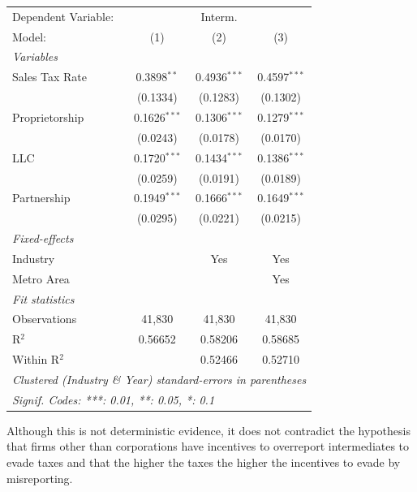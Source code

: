\documentclass[
  12pt]{article}
\theoremstyle{definition}
\theoremstyle{remark}
\begin{document}
\begin{table}
\begin{minipage}{\linewidth}
\begingroup
\centering
\begin{tabular}{lccc}
   \tabularnewline \midrule \midrule
   Dependent Variable: & \multicolumn{3}{c}{Interm.}\\
   Model:         & (1)            & (2)            & (3)\\  
   \midrule
   \emph{Variables}\\
   Sales Tax Rate & 0.3898$^{**}$  & 0.4936$^{***}$ & 0.4597$^{***}$\\   
                  & (0.1334)       & (0.1283)       & (0.1302)\\   
   Proprietorship & 0.1626$^{***}$ & 0.1306$^{***}$ & 0.1279$^{***}$\\   
                  & (0.0243)       & (0.0178)       & (0.0170)\\   
   LLC            & 0.1720$^{***}$ & 0.1434$^{***}$ & 0.1386$^{***}$\\   
                  & (0.0259)       & (0.0191)       & (0.0189)\\   
   Partnership    & 0.1949$^{***}$ & 0.1666$^{***}$ & 0.1649$^{***}$\\   
                  & (0.0295)       & (0.0221)       & (0.0215)\\   
   \midrule
   \emph{Fixed-effects}\\
   Industry       &                & Yes            & Yes\\  
   Metro Area     &                &                & Yes\\  
   \midrule
   \emph{Fit statistics}\\
   Observations   & 41,830         & 41,830         & 41,830\\  
   R$^2$          & 0.56652        & 0.58206        & 0.58685\\  
   Within R$^2$   &                & 0.52466        & 0.52710\\  
   \midrule \midrule
   \multicolumn{4}{l}{\emph{Clustered (Industry \& Year) standard-errors in parentheses}}\\
   \multicolumn{4}{l}{\emph{Signif. Codes: ***: 0.01, **: 0.05, *: 0.1}}\\
\end{tabular}
\par\endgroup

\end{minipage}%

\end{table}%

Although this is not deterministic evidence, it does not contradict the
hypothesis that firms other than corporations have incentives to
overreport intermediates to evade taxes and that the higher the taxes
the higher the incentives to evade by misreporting.
\end{document}
